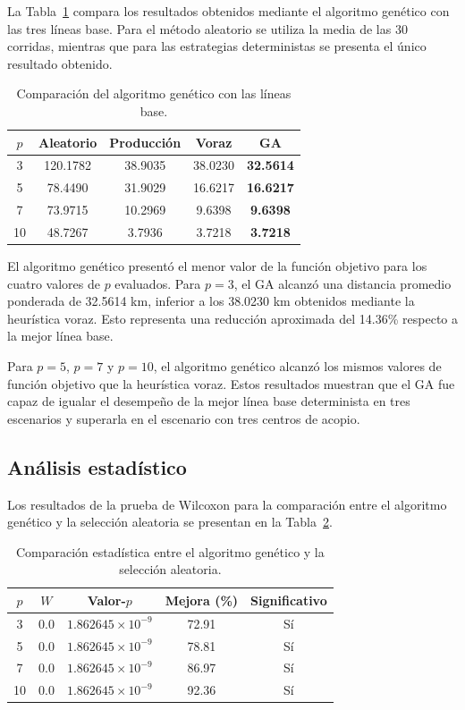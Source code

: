 \documentclass[journal]{IEEEtran}
\begin{document}
La Tabla~\ref{tab:comparacion_ga} compara los resultados obtenidos mediante el algoritmo genético con las tres líneas base. Para el método aleatorio se utiliza la media de las 30 corridas, mientras que para las estrategias deterministas se presenta el único resultado obtenido.

\begin{table}[!t]
	\centering
	\caption{Comparación del algoritmo genético con las líneas base.}
	\label{tab:comparacion_ga}
	\begin{tabular}{ccccc}
		\toprule
		\textbf{$p$} &
		\textbf{Aleatorio} &
		\textbf{Producción} &
		\textbf{Voraz} &
		\textbf{GA} \\
		\midrule
		3  & 120.1782 & 38.9035 & 38.0230 & \textbf{32.5614} \\
		5  &  78.4490 & 31.9029 & 16.6217 & \textbf{16.6217} \\
		7  &  73.9715 & 10.2969 &  9.6398 & \textbf{9.6398} \\
		10 &  48.7267 &  3.7936 &  3.7218 & \textbf{3.7218} \\
		\bottomrule
	\end{tabular}
\end{table}

El algoritmo genético presentó el menor valor de la función objetivo para los cuatro valores de $p$ evaluados. Para $p=3$, el GA alcanzó una distancia promedio ponderada de 32.5614 km, inferior a los 38.0230 km obtenidos mediante la heurística voraz. Esto representa una reducción aproximada del 14.36\% respecto a la mejor línea base.

Para $p=5$, $p=7$ y $p=10$, el algoritmo genético alcanzó los mismos valores de función objetivo que la heurística voraz. Estos resultados muestran que el GA fue capaz de igualar el desempeño de la mejor línea base determinista en tres escenarios y superarla en el escenario con tres centros de acopio.

\subsection{Análisis estadístico}

Los resultados de la prueba de Wilcoxon para la comparación entre el algoritmo genético y la selección aleatoria se presentan en la Tabla~\ref{tab:wilcoxon}.

\begin{table}[!t]
	\centering
	\caption{Comparación estadística entre el algoritmo genético y la selección aleatoria.}
	\label{tab:wilcoxon}
	\begin{tabular}{ccccc}
		\toprule
		\textbf{$p$} &
		\textbf{$W$} &
		\textbf{Valor-$p$} &
		\textbf{Mejora (\%)} &
		\textbf{Significativo} \\
		\midrule
		3  & 0.0 & $1.862645\times10^{-9}$ & 72.91 & Sí \\
		5  & 0.0 & $1.862645\times10^{-9}$ & 78.81 & Sí \\
		7  & 0.0 & $1.862645\times10^{-9}$ & 86.97 & Sí \\
		10 & 0.0 & $1.862645\times10^{-9}$ & 92.36 & Sí \\
		\bottomrule
	\end{tabular}
\end{table}
\end{document}
